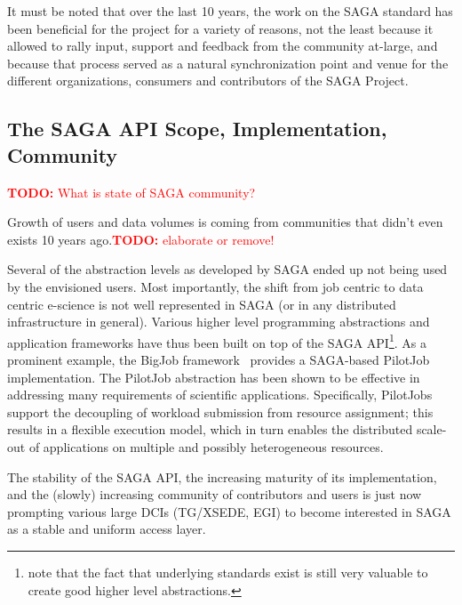 \documentclass[]{article}
\newcommand{\B}[1]{\textbf{#1}}
\newcommand{\todo}[1]{{\textcolor{red}{\B{TODO:} #1 }}}
\newcommand{\todo}[1]{}
\begin{document}
  It must be noted that over the last 10 years, the work on the SAGA
  standard has been beneficial for the project for a variety of reasons,
  not the least because it allowed to rally input, support and feedback
  from the community at-large, and because that process served as
  a natural synchronization point and venue for the different
  organizations, consumers and contributors of the SAGA Project.


 \subsection{The SAGA API Scope, Implementation, Community}

  \todo{What is state of SAGA community?}

  Growth of users and data volumes is coming from communities that
  didn't even exists 10 years ago.\todo{elaborate or remove!}
 
  Several of the abstraction levels as developed by SAGA ended up not
  being used by the envisioned users.  Most importantly, the shift from
  job centric to data centric e-science is not well represented in SAGA
  (or in any distributed infrastructure in general).  Various higher
  level programming abstractions and application frameworks have thus
  been built on top of the SAGA API\footnote{note that the fact that
  underlying standards exist is still very valuable to create good
  higher level abstractions.}.  As a prominent example, the BigJob
  framework~\cite{saga_bigjob_condor_cloud}  provides a SAGA-based
  PilotJob implementation. The PilotJob abstraction has been shown to be
  effective in addressing many requirements of scientific applications.
  Specifically, PilotJobs support the decoupling of workload submission
  from resource assignment; this results in a flexible execution model,
  which in turn enables the distributed scale-out of applications on
  multiple and possibly heterogeneous resources. %

  The stability of the SAGA API, the increasing maturity of its
  implementation, and the (slowly) increasing community of contributors
  and users is just now prompting various large DCIs (TG/XSEDE, EGI) to
  become interested in SAGA as a stable and uniform access layer.  %
\end{document}
